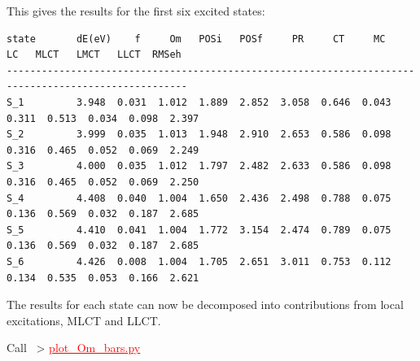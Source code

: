 \documentclass[DIV=12,headings=normal]{scrartcl}
\newcommand{\redl}[1]{{\textcolor{red}{\underline{#1}}}}
\newcommand{\comm}[1]{
\small
~> \redl{#1}
\normalsize
}
\begin{document}
This gives the results for the first six excited states:
\scriptsize
\begin{Verbatim}[commandchars=\\\{\}]
state       dE(eV)    f     Om   POSi   POSf     PR     CT     MC     LC   MLCT   LMCT   LLCT  RMSeh
-----------------------------------------------------------------------------------------------------
S_1         3.948  0.031  1.012  1.889  2.852  3.058  0.646  0.043  0.311  0.513  0.034  0.098  2.397
S_2         3.999  0.035  1.013  1.948  2.910  2.653  0.586  0.098  0.316  0.465  0.052  0.069  2.249
S_3         4.000  0.035  1.012  1.797  2.482  2.633  0.586  0.098  0.316  0.465  0.052  0.069  2.250
S_4         4.408  0.040  1.004  1.650  2.436  2.498  0.788  0.075  0.136  0.569  0.032  0.187  2.685
S_5         4.410  0.041  1.004  1.772  3.154  2.474  0.789  0.075  0.136  0.569  0.032  0.187  2.685
S_6         4.426  0.008  1.004  1.705  2.651  3.011  0.753  0.112  0.134  0.535  0.053  0.166  2.621
\end{Verbatim}
\normalsize

The results for each state can now be decomposed into contributions from local excitations, MLCT and LLCT.

Call \comm{plot\_Om\_bars.py}
\end{document}
